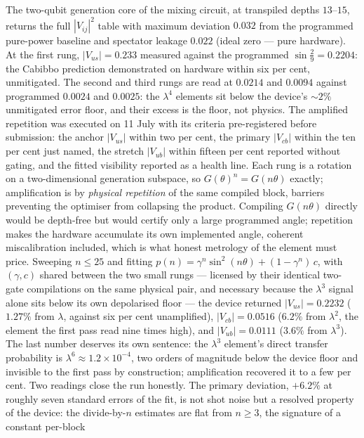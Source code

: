 The two-qubit generation core of the mixing circuit, at transpiled depths $13$--$15$, returns the
full $|V_{ij}|^{2}$ table with maximum deviation $0.032$ from the programmed pure-power baseline
and spectator leakage $0.022$ (ideal zero --- pure hardware). At the first rung,
$|V_{us}| = 0.233$ measured against the programmed $\sin\tfrac29 = 0.2204$: the Cabibbo
prediction demonstrated on hardware within six per cent, unmitigated. The second and third rungs
are read at $0.0214$ and $0.0094$ against programmed $0.0024$ and $0.0025$: the $\lambda^{4}$
elements sit below the device's $\sim 2\%$ unmitigated error floor, and their excess is the floor,
not physics. The amplified repetition was executed on 11 July with its criteria pre-registered before
submission: the anchor $|V_{us}|$ within two per cent, the primary $|V_{cb}|$ within the ten per
cent just named, the stretch $|V_{ub}|$ within fifteen per cent reported without gating, and the
fitted visibility reported as a health line. Each rung is a rotation on a two-dimensional
generation subspace, so $G(\theta)^{n} = G(n\theta)$ exactly; amplification is by \emph{physical
repetition} of the same compiled block, barriers preventing the optimiser from collapsing the
product. Compiling $G(n\theta)$ directly would be depth-free but would certify only a large
programmed angle; repetition makes the hardware accumulate its own implemented angle, coherent
miscalibration included, which is what honest metrology of the element must price. Sweeping
$n \le 25$ and fitting $p(n) = \gamma^{n}\sin^{2}(n\theta) + (1-\gamma^{n})\,c$, with
$(\gamma, c)$ shared between the two small rungs --- licensed by their identical two-gate
compilations on the same physical pair, and necessary because the $\lambda^{3}$ signal alone sits
below its own depolarised floor --- the device returned $|V_{us}| = 0.2232$ ($1.27\%$ from
$\lambda$, against six per cent unamplified), $|V_{cb}| = 0.0516$ ($6.2\%$ from $\lambda^{2}$,
the element the first pass read nine times high), and $|V_{ub}| = 0.0111$ ($3.6\%$ from
$\lambda^{3}$). The last number deserves its own sentence: the $\lambda^{3}$ element's direct
transfer probability is $\lambda^{6} \approx 1.2\times10^{-4}$, two orders of magnitude below the
device floor and invisible to the first pass by construction; amplification recovered it to a few
per cent. Two readings close the run honestly. The primary deviation, $+6.2\%$ at roughly seven
standard errors of the fit, is not shot noise but a resolved property of the device: the
divide-by-$n$ estimates are flat from $n \ge 3$, the signature of a constant per-block
